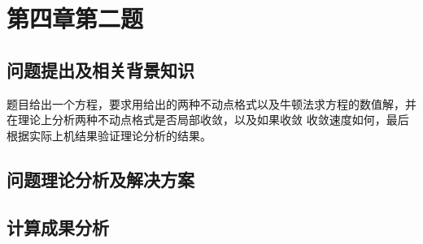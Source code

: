 \documentclass{ctexart}
\begin{document}
\section{第四章第二题}
\subsection{问题提出及相关背景知识}
题目给出一个方程，要求用给出的两种不动点格式以及牛顿法求方程的数值解，并在理论上分析两种不动点格式是否局部收敛，以及如果收敛
收敛速度如何，最后根据实际上机结果验证理论分析的结果。
\subsection{问题理论分析及解决方案}
\subsection{计算成果分析}
\end{document}
